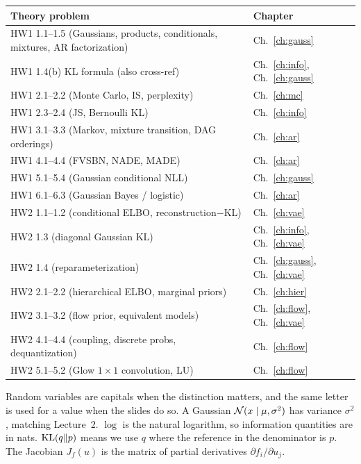 \begin{center}
\renewcommand{\arraystretch}{1.2}
\begin{tabularx}{\textwidth}{@{}lX@{}}
\toprule
\textbf{Theory problem} & \textbf{Chapter}\\
\midrule
HW1 1.1--1.5 (Gaussians, products, conditionals, mixtures, AR factorization) & Ch.~\ref{ch:gauss}\\
HW1 1.4(b) KL formula (also cross-ref) & Ch.~\ref{ch:info}, Ch.~\ref{ch:gauss}\\
HW1 2.1--2.2 (Monte Carlo, IS, perplexity) & Ch.~\ref{ch:mc}\\
HW1 2.3--2.4 (JS, Bernoulli KL) & Ch.~\ref{ch:info}\\
HW1 3.1--3.3 (Markov, mixture transition, DAG orderings) & Ch.~\ref{ch:ar}\\
HW1 4.1--4.4 (FVSBN, NADE, MADE) & Ch.~\ref{ch:ar}\\
HW1 5.1--5.4 (Gaussian conditional NLL) & Ch.~\ref{ch:gauss}\\
HW1 6.1--6.3 (Gaussian Bayes / logistic) & Ch.~\ref{ch:ar}\\
HW2 1.1--1.2 (conditional ELBO, reconstruction$-$KL) & Ch.~\ref{ch:vae}\\
HW2 1.3 (diagonal Gaussian KL) & Ch.~\ref{ch:info}, Ch.~\ref{ch:vae}\\
HW2 1.4 (reparameterization) & Ch.~\ref{ch:gauss}, Ch.~\ref{ch:vae}\\
HW2 2.1--2.2 (hierarchical ELBO, marginal priors) & Ch.~\ref{ch:hier}\\
HW2 3.1--3.2 (flow prior, equivalent models) & Ch.~\ref{ch:flow}, Ch.~\ref{ch:vae}\\
HW2 4.1--4.4 (coupling, discrete probs, dequantization) & Ch.~\ref{ch:flow}\\
HW2 5.1--5.2 (Glow $1\times 1$ convolution, LU) & Ch.~\ref{ch:flow}\\
\bottomrule
\end{tabularx}
\end{center}

\begin{defbox}
Random variables are capitals when the distinction matters, and the same letter is used for a value when the slides do so. A Gaussian $\mathcal{N}(x\mid\mu,\sigma^2)$ has variance $\sigma^2$, matching Lecture~2. $\log$ is the natural logarithm, so information quantities are in nats. $\mathrm{KL}(q\Vert p)$ means we use $q$ where the reference in the denominator is $p$. The Jacobian $J_f(u)$ is the matrix of partial derivatives $\partial f_i/\partial u_j$.
\end{defbox}
